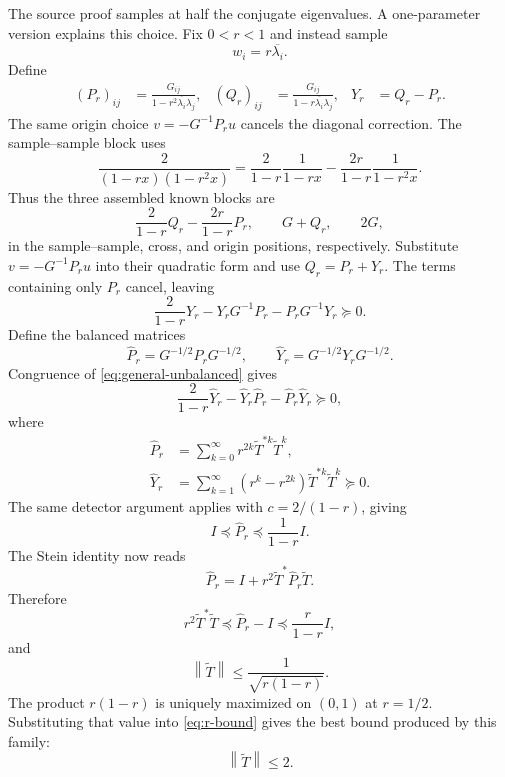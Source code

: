 \documentclass[11pt,oneside,openany]{book}
\theoremstyle{definition}
\theoremstyle{remark}
\newcommand{\norm}[1]{\left\lVert #1\right\rVert}
\begin{document}
The source proof samples at half the conjugate eigenvalues.  A
one-parameter version explains this choice.  Fix \(0<r<1\) and instead
sample
\[
  w_i=r\overline{\lambda_i}.
\]
Define
\begin{align}
  (P_r)_{ij}
  &=\frac{G_{ij}}{1-r^2\overline{\lambda_i}\lambda_j},
  &
  (Q_r)_{ij}
  &=\frac{G_{ij}}{1-r\overline{\lambda_i}\lambda_j},
  &
  Y_r&=Q_r-P_r.
  \label{eq:general-PQ}
\end{align}
The same origin choice \(v=-G^{-1}P_ru\) cancels the diagonal
correction.  The sample--sample block uses
\begin{equation}
  \frac{2}{(1-rx)(1-r^2x)}
  =
  \frac{2}{1-r}\frac{1}{1-rx}
  -\frac{2r}{1-r}\frac{1}{1-r^2x}.
  \label{eq:general-partial-fraction}
\end{equation}
Thus the three assembled known blocks are
\[
  \frac{2}{1-r}Q_r-\frac{2r}{1-r}P_r,
  \qquad
  G+Q_r,
  \qquad
  2G,
\]
in the sample--sample, cross, and origin positions, respectively.
Substitute \(v=-G^{-1}P_ru\) into their quadratic form and use
\(Q_r=P_r+Y_r\).  The terms containing only \(P_r\) cancel, leaving
\begin{equation}
  \frac{2}{1-r}Y_r
  -Y_rG^{-1}P_r
  -P_rG^{-1}Y_r\succeq0.
  \label{eq:general-unbalanced}
\end{equation}
Define the balanced matrices
\[
  \widehat P_r=G^{-1/2}P_rG^{-1/2},
  \qquad
  \widehat Y_r=G^{-1/2}Y_rG^{-1/2}.
\]
Congruence of \eqref{eq:general-unbalanced} gives
\begin{equation}
  \frac{2}{1-r}\widehat Y_r
  -\widehat Y_r\widehat P_r
  -\widehat P_r\widehat Y_r\succeq0,
  \label{eq:general-anticommutator}
\end{equation}
where
\begin{align}
  \widehat P_r
  &=\sum_{k=0}^{\infty}
    r^{2k}\widetilde T^{*k}\widetilde T^k,
  \label{eq:Pr-series}\\
  \widehat Y_r
  &=\sum_{k=1}^{\infty}
    (r^k-r^{2k})\widetilde T^{*k}\widetilde T^k
    \succeq0.
  \label{eq:Yr-series}
\end{align}
The same detector argument applies with
\(
c=2/(1-r)
\),
giving
\[
  I\preceq\widehat P_r\preceq\frac{1}{1-r}I.
\]
The Stein identity now reads
\[
  \widehat P_r
  =I+r^2\widetilde T^*\widehat P_r\widetilde T.
\]
Therefore
\[
  r^2\widetilde T^*\widetilde T
  \preceq\widehat P_r-I
  \preceq\frac{r}{1-r}I,
\]
and
\begin{equation}
  \norm{\widetilde T}
  \leq\frac{1}{\sqrt{r(1-r)}}.
  \label{eq:r-bound}
\end{equation}
The product \(r(1-r)\) is uniquely maximized on \((0,1)\) at
\(r=1/2\).  Substituting that value into \eqref{eq:r-bound} gives the
best bound produced by this family:
\[
  \norm{\widetilde T}\leq2.
\]
\end{document}
